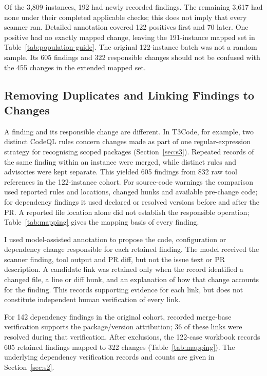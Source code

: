 \documentclass[acmsmall,screen,nonacm]{acmart}
\begin{document}
Of the 3,809 instances, 192 had newly recorded findings. The remaining 3,617 had none under their completed applicable checks; this does not imply that every scanner ran. Detailed annotation covered 122 positives first and 70 later. One positive had no exactly mapped change, leaving the 191-instance mapped set in Table~\ref{tab:population-guide}. The original 122-instance batch was not a random sample. Its 605 findings and 322 responsible changes should not be confused with the 455 changes in the extended mapped set.

\subsection{Removing Duplicates and Linking Findings to Changes}\label{sec:attrib}

A finding and its responsible change are different. In T3Code, for example, two distinct CodeQL rules concern changes made as part of one regular-expression strategy for recognising scoped packages (Section~\ref{sec:s3}). Repeated records of the same finding within an instance were merged, while distinct rules and advisories were kept separate. This yielded 605 findings from 832 raw tool references in the 122-instance cohort. For source-code warnings the comparison used reported rules and locations, changed hunks and available pre-change code; for dependency findings it used declared or resolved versions before and after the PR. A reported file location alone did not establish the responsible operation; Table~\ref{tab:mapping} gives the mapping basis of every finding.

I used model-assisted annotation to propose the code, configuration or dependency change responsible for each retained finding. The model received the scanner finding, tool output and PR diff, but not the issue text or PR description. A candidate link was retained only when the record identified a changed file, a line or diff hunk, and an explanation of how that change accounts for the finding. This records supporting evidence for each link, but does not constitute independent human verification of every link.

For 142 dependency findings in the original cohort, recorded merge-base verification supports the package/version attribution; 36 of these links were resolved during that verification. After exclusions, the 122-case workbook records 605 retained findings mapped to 322 changes (Table~\ref{tab:mapping}). The underlying dependency verification records and counts are given in Section~\ref{sec:s2}.
\end{document}
